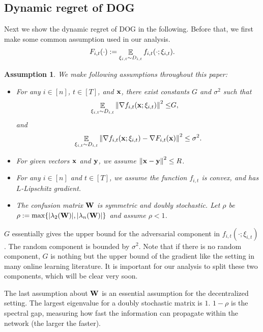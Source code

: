 \documentclass{article}
\newtheorem{Assumption}{\bf{Assumption}}
\begin{document}
\subsection{Dynamic regret of DOG}
\label{subsection_theoretical_analysis}
Next we show the dynamic regret of DOG in the following. Before that, we first make some common assumption used in our analysis. 
\begin{align}
\nonumber
F_{i,t}(\cdot) := \mathop{\mathbb{E}}_{\xi_{i,t} \sim D_{i,t}} f_{i,t}(\cdot; \xi_{i,t}).
\end{align}

\begin{Assumption}
\label{assumption_bounded_gradient_domain}
We make following assumptions throughout this paper:
\begin{itemize}
\item For any $i\in[n]$, $t\in[T]$, and ${\bf x}$, there exist constants $G$ and $\sigma^2$ such that
\begin{align}
\nonumber
\mathop{\mathbb{E}}_{ \xi_{i,t} \sim D_{i,t} }\left\lVert\nabla f_{i,t}({\bf x};\xi_{i,t})\right\rVert^2 \le &  G,
\end{align} and 
\begin{align}
\nonumber
\mathop{\mathbb{E}}_{ \xi_{i,t} \sim D_{i,t} } \left\lVert\nabla f_{i,t}({\bf x}; \xi_{i,t}) - \nabla F_{i,t}({\bf x})\right\rVert^2 \le \sigma^2.
\end{align}
\item For given vectors ${\bf x}$ and ${\bf y}$, we assume $\left\lVert{\bf x}-{\bf y}\right\rVert^2 \le R$.
\item  For any $i\in[n]$ and $t\in[T]$, we assume the function $f_{i,t}$ is convex, and has $L$-Lipschitz gradient. 
\item The confusion matrix ${\bf W}$ is symmetric and doubly stochastic. Let $\rho$ be $\rho := \max\{ |\lambda_2({\bf W})|, |\lambda_n({\bf W})| \}$ and assume $\rho <1$.
\end{itemize}
\end{Assumption}
$G$ essentially gives the upper bound for the adversarial component in $f_{i,t}(\cdot; \xi_{i,t})$. The random component is bounded by $\sigma^2$. Note that if there is no random component, $G$ is nothing but the upper bound of the gradient like the setting in many online learning literature. It is important for our analysis to split these two components, which will be clear very soon. 

The last assumption about ${\bf W}$ is an essential assumption for the decentralized setting. The largest eigenvalue for a doubly stochastic matrix is $1$. $1-\rho$ is the spectral gap, measuring how fast the information can propagate within the network (the larger the faster). 
\end{document}
